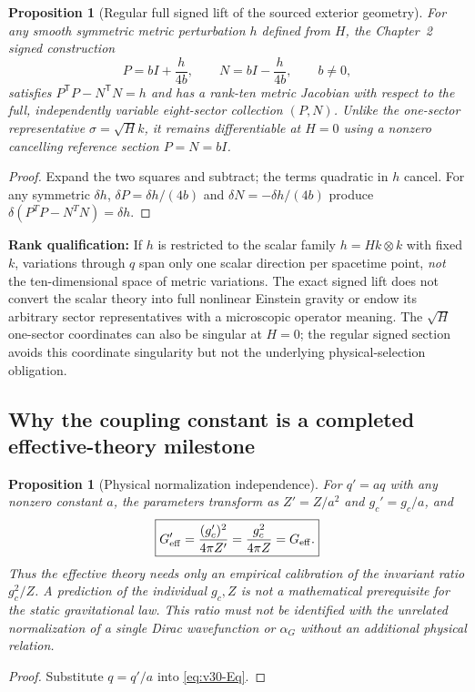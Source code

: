 \documentclass[11pt,a4paper]{article}
\newtheorem{proposition}[theorem]{Proposition}
\theoremstyle{remark}\newtheorem{remark}[theorem]{Remark}
\begin{document}
\begin{proposition}[Regular full signed lift of the sourced exterior geometry]\label{prop:v30-signed}
For any smooth symmetric metric perturbation $h$ defined from $H$, the Chapter~2 signed construction
\begin{equation}\label{eq:v30-signed}
P=bI+\frac{h}{4b},\qquad N=bI-\frac{h}{4b},\qquad b\ne0,
\end{equation}
satisfies $P^{\mathsf T}P-N^{\mathsf T}N=h$ and has a rank-ten metric Jacobian with respect to the \emph{full, independently variable eight-sector collection} $(P,N)$. Unlike the one-sector representative $\sigma=\sqrt H k$, it remains differentiable at $H=0$ using a nonzero cancelling reference section $P=N=bI$.
\end{proposition}
\begin{proof} Expand the two squares and subtract; the terms quadratic in $h$ cancel. For any symmetric $\delta h$, $\delta P=\delta h/(4b)$ and $\delta N=-\delta h/(4b)$ produce $\delta(P^TP-N^TN)=\delta h$.\end{proof}
\noindent\textbf{Rank qualification:} If $h$ is restricted to the scalar family $h=Hk\otimes k$ with fixed $k$, variations through $q$ span only one scalar direction per spacetime point, \emph{not} the ten-dimensional space of metric variations. The exact signed lift does not convert the scalar theory into full nonlinear Einstein gravity or endow its arbitrary sector representatives with a microscopic operator meaning. The $\sqrt H$ one-sector coordinates can also be singular at $H=0$; the regular signed section avoids this coordinate singularity but not the underlying physical-selection obligation.

\subsection{Why the coupling constant is a completed effective-theory milestone}
\begin{proposition}[Physical normalization independence]\label{prop:v30-normal}
For $q'=aq$ with any nonzero constant $a$, the parameters transform as $Z'=Z/a^2$ and $g_c'=g_c/a$, and
\begin{equation}\label{eq:v30-invariance}
\boxed{G_{\rm eff}'=\frac{(g_c')^2}{4\pi Z'}=\frac{g_c^2}{4\pi Z}=G_{\rm eff}.}
\end{equation}
Thus the effective theory needs only an empirical calibration of the \emph{invariant} ratio $g_c^2/Z$. A prediction of the individual $g_c,Z$ is not a mathematical prerequisite for the static gravitational law. This ratio must not be identified with the unrelated normalization of a single Dirac wavefunction or $\alpha_G$ without an additional physical relation.
\end{proposition}
\begin{proof} Substitute $q=q'/a$ into \eqref{eq:v30-Eq}.\end{proof}
\end{document}
